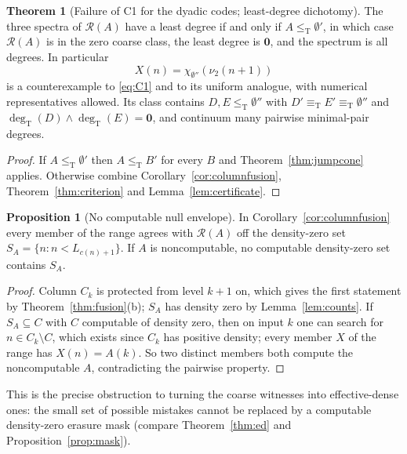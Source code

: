 \documentclass[11pt,letterpaper]{article}
\theoremstyle{definition}
\newtheorem{theorem}[definition]{Theorem}
\newtheorem{proposition}[definition]{Proposition}
\numberwithin{equation}{section}
\newcommand{\leT}{\le_{\mathrm T}}
\newcommand{\eqT}{\equiv_{\mathrm T}}
\newcommand{\degT}{\deg_{\mathrm T}}
\newcommand{\Rc}{\mathcal R}
\newcommand{\zero}{\mathbf 0}
\newcommand{\src}[1]{\leavevmode{\sffamily\footnotesize\color{Steel}[#1]}}
\begin{document}
\begin{theorem}[Failure of C1 for the dyadic codes; least-degree dichotomy]\label{thm:columnsC1}\src{R3, R4}
The three spectra of $\Rc(A)$ have a least degree if and only if $A\leT\emptyset'$, in which case $\Rc(A)$ is in the zero coarse class, the least degree is $\zero$, and the spectrum is all degrees. In particular
\[
 X(n)=\chi_{\emptyset''}(\nu_2(n+1))
\]
is a counterexample to \eqref{eq:C1} and to its uniform analogue, with numerical representatives allowed. Its class contains $D,E\leT\emptyset''$ with $D'\eqT E'\eqT\emptyset''$ and $\degT(D)\wedge\degT(E)=\zero$, and continuum many pairwise minimal-pair degrees.
\end{theorem}
\begin{proof}
If $A\leT\emptyset'$ then $A\leT B'$ for every $B$ and Theorem~\ref{thm:jumpcone} applies. Otherwise combine Corollary~\ref{cor:columnfusion}, Theorem~\ref{thm:criterion} and Lemma~\ref{lem:certificate}.
\end{proof}

\begin{proposition}[No computable null envelope]\label{prop:envelope}\src{R4}
In Corollary~\ref{cor:columnfusion} every member of the range agrees with $\Rc(A)$ off the density-zero set $S_A=\{n:n<L_{c(n)+1}\}$. If $A$ is noncomputable, no computable density-zero set contains $S_A$.
\end{proposition}
\begin{proof}
Column $C_k$ is protected from level $k+1$ on, which gives the first statement by Theorem~\ref{thm:fusion}(b); $S_A$ has density zero by Lemma~\ref{lem:counts}. If $S_A\subseteq C$ with $C$ computable of density zero, then on input $k$ one can search for $n\in C_k\setminus C$, which exists since $C_k$ has positive density; every member $X$ of the range has $X(n)=A(k)$. So two distinct members both compute the noncomputable $A$, contradicting the pairwise property.
\end{proof}
This is the precise obstruction to turning the coarse witnesses into effective-dense ones: the small set of possible mistakes cannot be replaced by a computable density-zero erasure mask (compare Theorem~\ref{thm:ed} and Proposition~\ref{prop:mask}).
\end{document}
